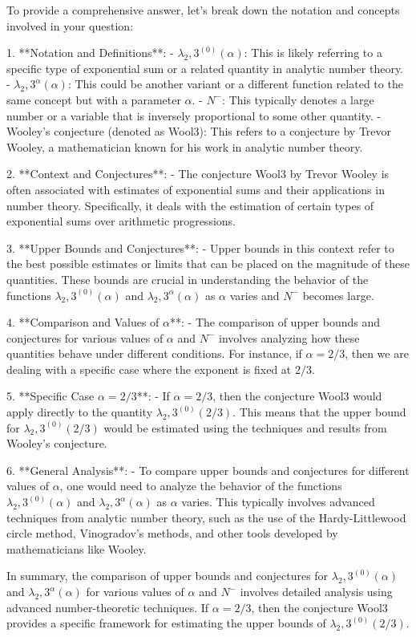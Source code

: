 To provide a comprehensive answer, let's break down the notation and concepts involved in your question:

1. **Notation and Definitions**:
   - \(\lambda_2, 3^{(0)}(\alpha)\): This is likely referring to a specific type of exponential sum or a related quantity in analytic number theory.
   - \(\lambda_2, 3^{\alpha}(\alpha)\): This could be another variant or a different function related to the same concept but with a parameter \(\alpha\).
   - \(N^{-}\): This typically denotes a large number or a variable that is inversely proportional to some other quantity.
   - Wooley's conjecture (denoted as Wool3): This refers to a conjecture by Trevor Wooley, a mathematician known for his work in analytic number theory.

2. **Context and Conjectures**:
   - The conjecture Wool3 by Trevor Wooley is often associated with estimates of exponential sums and their applications in number theory. Specifically, it deals with the estimation of certain types of exponential sums over arithmetic progressions.

3. **Upper Bounds and Conjectures**:
   - Upper bounds in this context refer to the best possible estimates or limits that can be placed on the magnitude of these quantities. These bounds are crucial in understanding the behavior of the functions \(\lambda_2, 3^{(0)}(\alpha)\) and \(\lambda_2, 3^{\alpha}(\alpha)\) as \(\alpha\) varies and \(N^{-}\) becomes large.

4. **Comparison and Values of \(\alpha\)**:
   - The comparison of upper bounds and conjectures for various values of \(\alpha\) and \(N^{-}\) involves analyzing how these quantities behave under different conditions. For instance, if \(\alpha = 2/3\), then we are dealing with a specific case where the exponent is fixed at \(2/3\).

5. **Specific Case \(\alpha = 2/3\)**:
   - If \(\alpha = 2/3\), then the conjecture Wool3 would apply directly to the quantity \(\lambda_2, 3^{(0)}(2/3)\). This means that the upper bound for \(\lambda_2, 3^{(0)}(2/3)\) would be estimated using the techniques and results from Wooley's conjecture.

6. **General Analysis**:
   - To compare upper bounds and conjectures for different values of \(\alpha\), one would need to analyze the behavior of the functions \(\lambda_2, 3^{(0)}(\alpha)\) and \(\lambda_2, 3^{\alpha}(\alpha)\) as \(\alpha\) varies. This typically involves advanced techniques from analytic number theory, such as the use of the Hardy-Littlewood circle method, Vinogradov's methods, and other tools developed by mathematicians like Wooley.

In summary, the comparison of upper bounds and conjectures for \(\lambda_2, 3^{(0)}(\alpha)\) and \(\lambda_2, 3^{\alpha}(\alpha)\) for various values of \(\alpha\) and \(N^{-}\) involves detailed analysis using advanced number-theoretic techniques. If \(\alpha = 2/3\), then the conjecture Wool3 provides a specific framework for estimating the upper bounds of \(\lambda_2, 3^{(0)}(2/3)\).